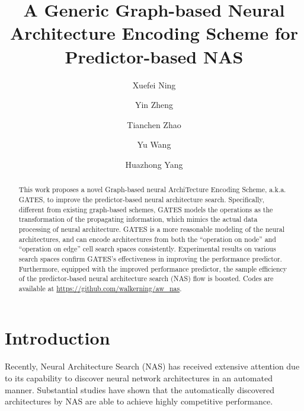 \documentclass[runningheads]{llncs}
\begin{document}
\pagestyle{headings}
\mainmatter
\def\ECCVSubNumber{1825}  

\title{A Generic Graph-based Neural Architecture Encoding Scheme for Predictor-based NAS}






\author{Xuefei Ning \and
  Yin Zheng \and
Tianchen Zhao \and
Yu Wang \and
Huazhong Yang}


\maketitle

\begin{abstract}
This work proposes a novel Graph-based neural ArchiTecture Encoding Scheme, a.k.a. GATES, to improve the predictor-based neural architecture search.
Specifically, different from existing graph-based schemes, GATES models the operations as the transformation of the propagating information, which mimics the actual data processing of neural architecture.
  GATES is a more reasonable modeling of the neural architectures, and can encode architectures from both the ``operation on node'' and ``operation on edge'' cell search spaces consistently. 
Experimental results on various search spaces confirm GATES's effectiveness in improving the performance predictor. Furthermore, equipped with the improved performance predictor, the sample efficiency of the predictor-based neural architecture search (NAS) flow is boosted. Codes are available at \url{https://github.com/walkerning/aw\_nas}.


\end{abstract}


\section{Introduction}
\label{sec:intro}

Recently, Neural Architecture Search (NAS) has received extensive attention due to its capability to discover neural network architectures in an automated manner. 
Substantial studies have shown that the automatically discovered architectures by NAS are able to achieve
highly competitive performance. 
\end{document}
